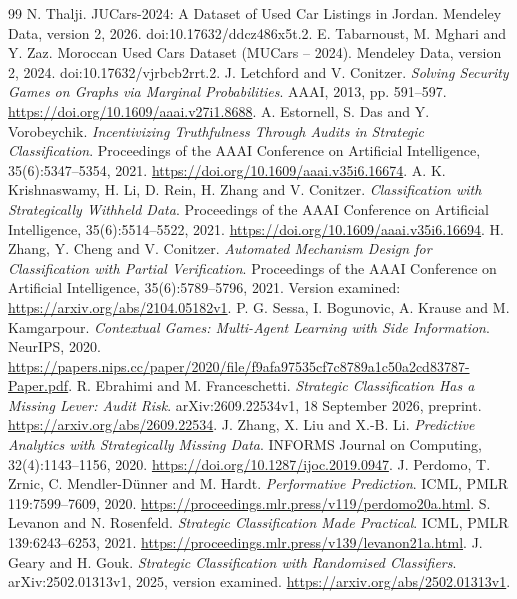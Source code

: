 \documentclass[11pt]{article}
\begin{document}
\begin{thebibliography}{99}
 N. Thalji.
JUCars-2024: A Dataset of Used Car Listings in Jordan.
Mendeley Data, version 2, 2026. doi:10.17632/ddcz486x5t.2.
 E. Tabarnoust, M. Mghari and Y. Zaz.
Moroccan Used Cars Dataset (MUCars -- 2024).
Mendeley Data, version 2, 2024. doi:10.17632/vjrbcb2rrt.2.
 J. Letchford and V. Conitzer.
\emph{Solving Security Games on Graphs via Marginal Probabilities}.
AAAI, 2013, pp. 591--597. \url{https://doi.org/10.1609/aaai.v27i1.8688}.
 A. Estornell, S. Das and Y. Vorobeychik.
\emph{Incentivizing Truthfulness Through Audits in Strategic Classification}.
Proceedings of the AAAI Conference on Artificial Intelligence,
35(6):5347--5354, 2021. \url{https://doi.org/10.1609/aaai.v35i6.16674}.
 A. K. Krishnaswamy, H. Li, D. Rein, H. Zhang and V. Conitzer.
\emph{Classification with Strategically Withheld Data}.
Proceedings of the AAAI Conference on Artificial Intelligence,
35(6):5514--5522, 2021. \url{https://doi.org/10.1609/aaai.v35i6.16694}.
 H. Zhang, Y. Cheng and V. Conitzer.
\emph{Automated Mechanism Design for Classification with Partial Verification}.
Proceedings of the AAAI Conference on Artificial Intelligence,
35(6):5789--5796, 2021.
Version examined: \url{https://arxiv.org/abs/2104.05182v1}.
 P. G. Sessa, I. Bogunovic, A. Krause and M. Kamgarpour.
\emph{Contextual Games: Multi-Agent Learning with Side Information}.
NeurIPS, 2020.
\url{https://papers.nips.cc/paper/2020/file/f9afa97535cf7c8789a1c50a2cd83787-Paper.pdf}.
 R. Ebrahimi and M. Franceschetti.
\emph{Strategic Classification Has a Missing Lever: Audit Risk}.
arXiv:2609.22534v1, 18 September 2026, preprint.
\url{https://arxiv.org/abs/2609.22534}.
 J. Zhang, X. Liu and X.-B. Li.
\emph{Predictive Analytics with Strategically Missing Data}.
INFORMS Journal on Computing, 32(4):1143--1156, 2020.
\url{https://doi.org/10.1287/ijoc.2019.0947}.
 J. Perdomo, T. Zrnic, C. Mendler-D\"unner and M. Hardt.
\emph{Performative Prediction}. ICML, PMLR 119:7599--7609, 2020.
\url{https://proceedings.mlr.press/v119/perdomo20a.html}.
 S. Levanon and N. Rosenfeld.
\emph{Strategic Classification Made Practical}. ICML, PMLR 139:6243--6253, 2021.
\url{https://proceedings.mlr.press/v139/levanon21a.html}.
 J. Geary and H. Gouk.
\emph{Strategic Classification with Randomised Classifiers}.
arXiv:2502.01313v1, 2025, version examined.
\url{https://arxiv.org/abs/2502.01313v1}.
\end{thebibliography}
\end{document}
